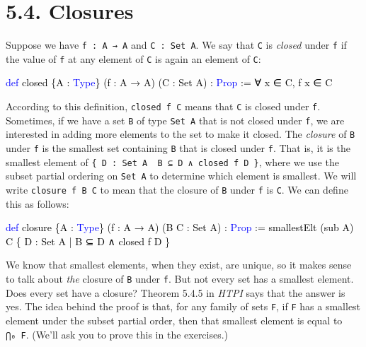 \documentclass[
  letterpaper,
  DIV=11,
  numbers=noendperiod]{scrreprt}
\newenvironment{Shaded}{\begin{snugshade}}{\end{snugshade}}
\newcommand{\KeywordTok}[1]{\textcolor[rgb]{0.00,0.23,0.31}{#1}}
\newcommand{\NormalTok}[1]{\textcolor[rgb]{0.00,0.23,0.31}{#1}}
\renewcommand{\NormalTok}[1]{\textcolor[HTML]{000000}{#1}}
\renewcommand{\KeywordTok}[1]{\textcolor[HTML]{0000FF}{#1}}
\theoremstyle{remark}
\begin{document}
\hypertarget{closures}{%
\section{5.4. Closures}\label{closures}}

Suppose we have \texttt{f\ :\ A\ →\ A} and \texttt{C\ :\ Set\ A}. We say
that \texttt{C} is \emph{closed} under \texttt{f} if the value of
\texttt{f} at any element of \texttt{C} is again an element of
\texttt{C}:

\begin{Shaded}
\begin{Highlighting}[]
\KeywordTok{def}\NormalTok{ closed \{A : }\KeywordTok{Type}\NormalTok{\} (f : A → A) (C : Set A) : }\KeywordTok{Prop}\NormalTok{ := ∀ x ∈ C, f x ∈ C}
\end{Highlighting}
\end{Shaded}

According to this definition, \texttt{closed\ f\ C} means that
\texttt{C} is closed under \texttt{f}. Sometimes, if we have a set
\texttt{B} of type \texttt{Set\ A} that is not closed under \texttt{f},
we are interested in adding more elements to the set to make it closed.
The \emph{closure} of \texttt{B} under \texttt{f} is the smallest set
containing \texttt{B} that is closed under \texttt{f}. That is, it is
the smallest element of
\texttt{\{\ D\ :\ Set\ A\ \textbar{}\ B\ ⊆\ D\ ∧\ closed\ f\ D\ \}},
where we use the subset partial ordering on \texttt{Set\ A} to determine
which element is smallest. We will write \texttt{closure\ f\ B\ C} to
mean that the closure of \texttt{B} under \texttt{f} is \texttt{C}. We
can define this as follows:

\begin{Shaded}
\begin{Highlighting}[]
\KeywordTok{def}\NormalTok{ closure \{A : }\KeywordTok{Type}\NormalTok{\} (f : A → A) (B C : Set A) : }\KeywordTok{Prop}\NormalTok{ :=}
\NormalTok{  smallestElt (sub A) C \{ D : Set A | B ⊆ D ∧ closed f D \}}
\end{Highlighting}
\end{Shaded}

We know that smallest elements, when they exist, are unique, so it makes
sense to talk about \emph{the} closure of \texttt{B} under \texttt{f}.
But not every set has a smallest element. Does every set have a closure?
Theorem 5.4.5 in \emph{HTPI} says that the answer is yes. The idea
behind the proof is that, for any family of sets \texttt{F}, if
\texttt{F} has a smallest element under the subset partial order, then
that smallest element is equal to \texttt{⋂₀\ F}. (We'll ask you to
prove this in the exercises.)
\end{document}
